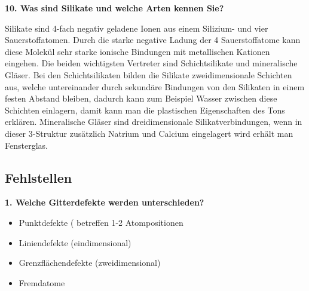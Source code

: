\noindent\textbf{10. Was sind Silikate und welche Arten kennen Sie?}\\
\begin{addmargin}[25pt]{0pt}    
Silikate sind 4-fach negativ geladene Ionen aus einem Silizium- und vier Sauerstoffatomen. Durch die starke negative Ladung der 4 Sauerstoffatome kann diese Molekül sehr starke ionische Bindungen mit metallischen Kationen eingehen. Die beiden wichtigsten Vertreter sind Schichtsilikate und mineralische Gläser. Bei den Schichtsilikaten bilden die Silikate zweidimensionale Schichten aus, welche untereinander durch sekundäre Bindungen von den Silikaten in einem festen Abstand bleiben, dadurch kann zum Beispiel Wasser zwischen diese Schichten einlagern, damit kann man die plastischen Eigenschaften des Tons erklären. Mineralische Gläser sind dreidimensionale Silikatverbindungen, wenn in dieser 3-Struktur zusätzlich Natrium und Calcium eingelagert wird erhält man Fensterglas.   \\
\end{addmargin}









\subsection{Fehlstellen}
\noindent\textbf{1. Welche Gitterdefekte werden unterschieden?}\\
\begin{addmargin}[25pt]{0pt}     
\begin{itemize}
\item Punktdefekte ( betreffen 1-2 Atompositionen
\item Liniendefekte (eindimensional)
\item Grenzflächendefekte (zweidimensional)
\item Fremdatome\\
\end{itemize}
\end{addmargin}

